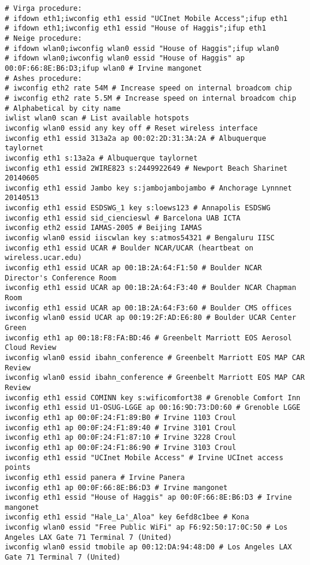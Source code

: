 \documentclass[12pt,twoside]{article}
\begin{document}
\begin{verbatim}
# Virga procedure: 
# ifdown eth1;iwconfig eth1 essid "UCInet Mobile Access";ifup eth1
# ifdown eth1;iwconfig eth1 essid "House of Haggis";ifup eth1
# Neige procedure: 
# ifdown wlan0;iwconfig wlan0 essid "House of Haggis";ifup wlan0
# ifdown wlan0;iwconfig wlan0 essid "House of Haggis" ap 00:0F:66:8E:B6:D3;ifup wlan0 # Irvine mangonet
# Ashes procedure:
# iwconfig eth2 rate 54M # Increase speed on internal broadcom chip
# iwconfig eth2 rate 5.5M # Increase speed on internal broadcom chip
# Alphabetical by city name
iwlist wlan0 scan # List available hotspots
iwconfig wlan0 essid any key off # Reset wireless interface
iwconfig eth1 essid 313a2a ap 00:02:2D:31:3A:2A # Albuquerque taylornet
iwconfig eth1 s:13a2a # Albuquerque taylornet
iwconfig eth1 essid 2WIRE823 s:2449922649 # Newport Beach Sharinet 20140605
iwconfig eth1 essid Jambo key s:jambojambojambo # Anchorage Lynnnet 20140513
iwconfig eth1 essid ESDSWG_1 key s:loews123 # Annapolis ESDSWG
iwconfig eth1 essid sid_ciencieswl # Barcelona UAB ICTA
iwconfig eth2 essid IAMAS-2005 # Beijing IAMAS
iwconfig wlan0 essid iiscwlan key s:atmos54321 # Bengaluru IISC
iwconfig eth1 essid UCAR # Boulder NCAR/UCAR (heartbeat on wireless.ucar.edu)
iwconfig eth1 essid UCAR ap 00:1B:2A:64:F1:50 # Boulder NCAR Director's Conference Room
iwconfig eth1 essid UCAR ap 00:1B:2A:64:F3:40 # Boulder NCAR Chapman Room
iwconfig eth1 essid UCAR ap 00:1B:2A:64:F3:60 # Boulder CMS offices
iwconfig wlan0 essid UCAR ap 00:19:2F:AD:E6:80 # Boulder UCAR Center Green 
iwconfig eth1 ap 00:18:F8:FA:BD:46 # Greenbelt Marriott EOS Aerosol Cloud Review
iwconfig wlan0 essid ibahn_conference # Greenbelt Marriott EOS MAP CAR Review
iwconfig wlan0 essid ibahn_conference # Greenbelt Marriott EOS MAP CAR Review
iwconfig eth1 essid COMINN key s:wificomfort38 # Grenoble Comfort Inn
iwconfig eth1 essid U1-OSUG-LGGE ap 00:16:9D:73:D0:60 # Grenoble LGGE
iwconfig eth1 ap 00:0F:24:F1:89:B0 # Irvine 1103 Croul
iwconfig eth1 ap 00:0F:24:F1:89:40 # Irvine 3101 Croul
iwconfig eth1 ap 00:0F:24:F1:87:10 # Irvine 3228 Croul
iwconfig eth1 ap 00:0F:24:F1:86:90 # Irvine 3103 Croul
iwconfig eth1 essid "UCInet Mobile Access" # Irvine UCInet access points
iwconfig eth1 essid panera # Irvine Panera
iwconfig eth1 ap 00:0F:66:8E:B6:D3 # Irvine mangonet
iwconfig eth1 essid "House of Haggis" ap 00:0F:66:8E:B6:D3 # Irvine mangonet
iwconfig eth1 essid "Hale_La'_Aloa" key 6efd8c1bee # Kona
iwconfig wlan0 essid "Free Public WiFi" ap F6:92:50:17:0C:50 # Los Angeles LAX Gate 71 Terminal 7 (United)
iwconfig wlan0 essid tmobile ap 00:12:DA:94:48:D0 # Los Angeles LAX Gate 71 Terminal 7 (United)

\end{verbatim}
\end{document}
